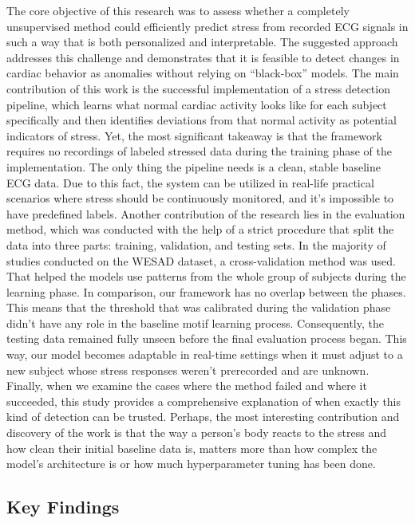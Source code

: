 \documentclass[conference,10pt]{IEEEtran}
\begin{document}
The core objective of this research was to assess whether a completely unsupervised method could efficiently predict stress from recorded ECG signals in such a way that is both personalized and interpretable. The suggested approach addresses this challenge and demonstrates that it is feasible to detect changes in cardiac behavior as anomalies without relying on “black-box” models.
The main contribution of this work is the successful implementation of a stress detection pipeline, which learns what normal cardiac activity looks like for each subject specifically and then identifies deviations from that normal activity as potential indicators of stress. Yet, the most significant takeaway is that the framework requires no recordings of labeled stressed data during the training phase of the implementation. The only thing the pipeline needs is a clean, stable baseline ECG data. Due to this fact, the system can be utilized in real-life practical scenarios where stress should be continuously monitored, and it’s impossible to have predefined labels. 
Another contribution of the research lies in the evaluation method, which was conducted with the help of a strict procedure that split the data into three parts: training, validation, and testing sets. In the majority of studies conducted on the WESAD dataset, a cross-validation method was used. That helped the models use patterns from the whole group of subjects during the learning phase. In comparison, our framework has no overlap between the phases. This means that the threshold that was calibrated during the validation phase didn’t have any role in the baseline motif learning process. Consequently, the testing data remained fully unseen before the final evaluation process began. This way, our model becomes adaptable in real-time settings when it must adjust to a new subject whose stress responses weren’t prerecorded and are unknown.
Finally, when we examine the cases where the method failed and where it succeeded, this study provides a comprehensive explanation of when exactly this kind of detection can be trusted. Perhaps, the most interesting contribution and discovery of the work is that the way a person’s body reacts to the stress and how clean their initial baseline data is, matters more than how complex the model’s architecture is or how much hyperparameter tuning has been done.

\subsection{Key Findings}
\end{document}
